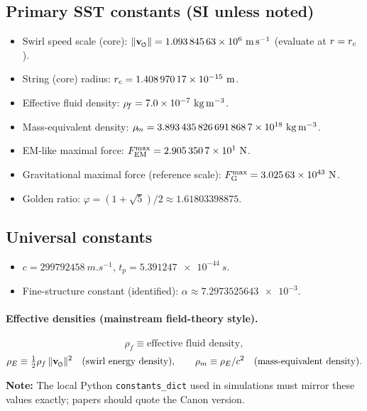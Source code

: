 \documentclass[11pt]{article}
\begin{document}
    \subsection*{Primary SST constants (SI unless noted)}
    \begin{itemize}
        \item Swirl speed scale (core): $\vnorm = \num{1.09384563e6}\ \si{m.s^{-1}}$ (evaluate at $r=\rc$).
        \item String (core) radius: $\rc = \num{1.40897017e-15}\ \si{m}$.
        \item Effective fluid density: $\rhof = \num{7.0e-7}\ \si{kg.m^{-3}}$.
        \item Mass-equivalent density: $\rhom = \num{3.8934358266918687e18}\ \si{kg.m^{-3}}$. %
        \item EM-like maximal force: $\FEMmax = \num{2.9053507e1}\ \si{N}$.
        \item Gravitational maximal force (reference scale): $\FGmax = \num{3.02563e43}\ \si{N}$.
        \item Golden ratio: $\varphi = (1+\sqrt{5})/2 \approx \num{1.61803398875}$.
    \end{itemize}

    \subsection*{Universal constants}
    \begin{itemize}
        \item $c=\num{299792458}\ \si{m.s^{-1}}$, \quad $t_p=\num{5.391247e-44}\ \si{s}$.
        \item Fine-structure constant (identified): $\alpha \approx \num{7.2973525643e-3}$.
    \end{itemize}

    \paragraph{Effective densities (mainstream field-theory style).}
    \[
        \rho_f \equiv \text{effective fluid density},
	\]
	\[
        \rho_E \equiv \tfrac12 \rho_f\, \vnorm^2\quad(\text{swirl energy density}),\qquad
        \rho_m \equiv \rho_E/c^2\quad(\text{mass-equivalent density}).
    \]

    \textbf{Note:} The local Python \texttt{constants\_dict} used in simulations must mirror these values exactly; papers should quote the Canon version.
\end{document}
